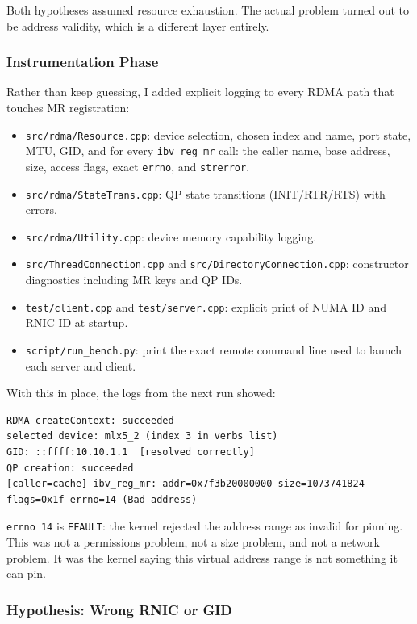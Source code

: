 \documentclass[10pt]{article}
\begin{document}
Both hypotheses assumed resource exhaustion.
The actual problem turned out to be address validity, which is a different layer
entirely.

\subsubsection{Instrumentation Phase}

Rather than keep guessing, I added explicit logging to every RDMA path that
touches MR registration:

\begin{itemize}[nosep]
  \item \texttt{src/rdma/Resource.cpp}: device selection, chosen index and name,
    port state, MTU, GID, and for every \texttt{ibv\_reg\_mr} call: the caller name,
    base address, size, access flags, exact \texttt{errno}, and \texttt{strerror}.
  \item \texttt{src/rdma/StateTrans.cpp}: QP state transitions (INIT/RTR/RTS)
    with errors.
  \item \texttt{src/rdma/Utility.cpp}: device memory capability logging.
  \item \texttt{src/ThreadConnection.cpp} and \texttt{src/DirectoryConnection.cpp}:
    constructor diagnostics including MR keys and QP IDs.
  \item \texttt{test/client.cpp} and \texttt{test/server.cpp}:
    explicit print of NUMA ID and RNIC ID at startup.
  \item \texttt{script/run\_bench.py}:
    print the exact remote command line used to launch each server and client.
\end{itemize}

With this in place, the logs from the next run showed:

\begin{lstlisting}
RDMA createContext: succeeded
selected device: mlx5_2 (index 3 in verbs list)
GID: ::ffff:10.10.1.1  [resolved correctly]
QP creation: succeeded
[caller=cache] ibv_reg_mr: addr=0x7f3b20000000 size=1073741824 flags=0x1f errno=14 (Bad address)
\end{lstlisting}

\texttt{errno 14} is \texttt{EFAULT}: the kernel rejected the address range as
invalid for pinning.
This was not a permissions problem, not a size problem, and not a network problem.
It was the kernel saying this virtual address range is not something it can pin.

\subsubsection{Hypothesis: Wrong RNIC or GID}
\end{document}
